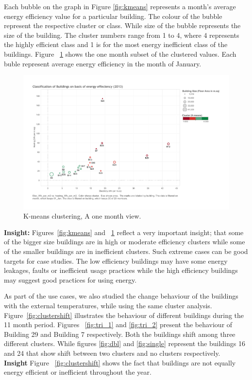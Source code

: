 Each bubble on the graph  in Figure \ref{fig:kmeans} represents a month's average energy efficiency value for a particular building. The colour of the bubble represent the respective cluster or class. While size of the bubble represents the size of the building. The cluster numbers range from 1 to 4, where 4 represents the highly efficient class and 1 is for the most energy inefficient class of the buildings. Figure ~\ref{fig:kmeans_jan} shows the one month subset of the clustered values. Each buble represent average energy efficiency in the month of January. 
\begin{figure}[!ht]
    \begin{center}
      \includegraphics[width=\textwidth]{images/kmeans_jan.pdf}
      \caption{K-means clustering, A one month view.}
      \label{fig:kmeans_jan}
    \end{center}
\end{figure} 

\textbf{Insight:} Figures~\ref{fig:kmeans} and ~\ref{fig:kmeans_jan} reflect a very important insight; that some of the bigger size buildings are in high or moderate efficiency clusters while some of the smaller buildings are in inefficient clusters. Such extreme cases can be good targets for case studies. The low efficiency buildings may have some energy leakages, faults or inefficient usage practices while the high efficiency buildings may suggest good practices for using energy. 

As part of the use cases, we also studied the change behaviour of the buildings with the external temperatures, while using the same cluster analysis. Figure~\ref{fig:clustershift} illustrates the behaviour of different buildings during the 11 month period. Figures ~\ref{fig:tri_1} and \ref{fig:tri_2} present the behaviour of Building 29 and Building 7 respectively. Both the buildings shift among three different clusters. While figures \ref{fig:dbl} and \ref{fig:single} represent the buildings 16 and 24 that show shift between two clusters and no clusters  respectively.
\\
\textbf{Insight} Figure ~\ref{fig:clustershift} shows the fact that buildings are not equally energy efficient or inefficient throughout the year. 

